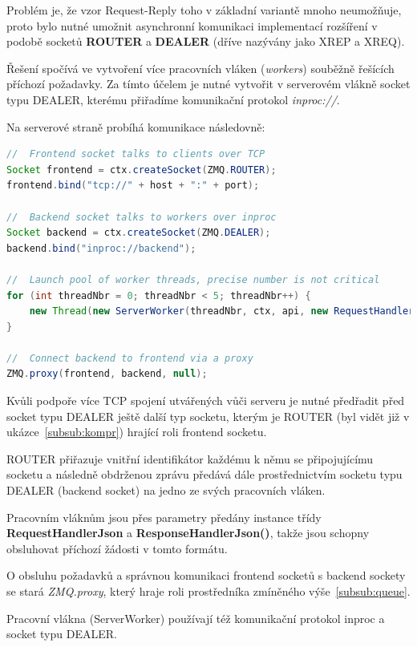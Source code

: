 \documentclass[thesis=M,czech]{FITthesis}[2014/05/07]
\begin{document}
Problém je, že vzor Request-Reply toho v základní variantě mnoho neumožňuje, proto bylo nutné umožnit asynchronní komunikaci implementací rozšíření v podobě socketů \textbf{ROUTER} a \textbf{DEALER} (dříve nazývány jako XREP a XREQ). 

Řešení spočívá ve vytvoření více pracovních vláken (\emph{workers}) souběžně řešících příchozí požadavky. Za tímto účelem je nutné vytvořit v serverovém vlákně socket typu DEALER, kterému přiřadíme komunikační protokol \emph{inproc://}.

Na serverové straně probíhá komunikace následovně: 

\begin{lstlisting}[language=java]
//  Frontend socket talks to clients over TCP
Socket frontend = ctx.createSocket(ZMQ.ROUTER);
frontend.bind("tcp://" + host + ":" + port);

//  Backend socket talks to workers over inproc
Socket backend = ctx.createSocket(ZMQ.DEALER);
backend.bind("inproc://backend");

//  Launch pool of worker threads, precise number is not critical
for (int threadNbr = 0; threadNbr < 5; threadNbr++) {
    new Thread(new ServerWorker(threadNbr, ctx, api, new RequestHandlerJson(), new ResponseHandlerJson())).start();
}

//  Connect backend to frontend via a proxy
ZMQ.proxy(frontend, backend, null);
\end{lstlisting}

Kvůli podpoře více TCP spojení utvářených vůči serveru je nutné předřadit před socket typu DEALER ještě další typ socketu, kterým je ROUTER (byl vidět již v ukázce~\ref{subsub:kompr}) hrající roli frontend socketu. 

ROUTER přiřazuje vnitřní identifikátor každému k němu se připojujícímu socketu a následně obdrženou zprávu předává dále prostřednictvím socketu typu DEALER (backend socket) na jedno ze svých pracovních vláken.

Pracovním vláknům jsou přes parametry předány instance třídy \textbf{RequestHandlerJson} a \textbf{ResponseHandlerJson()}, takže jsou schopny obsluhovat příchozí žádosti v tomto formátu.

O obsluhu požadavků a správnou komunikaci frontend socketů s backend sockety se stará \emph{ZMQ.proxy}, který hraje roli prostředníka zmíněného výše~\ref{subsub:queue}.

Pracovní vlákna (ServerWorker) používají též komunikační protokol inproc a socket typu DEALER.
\end{document}
